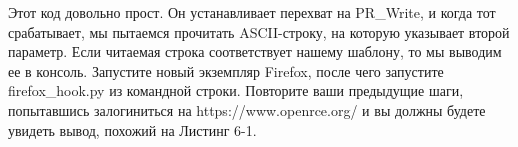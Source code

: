 \documentclass[12pt, a4paper, oneside]{book}
\begin{document}












Этот код довольно прост. Он устанавливает перехват на PR\_Write, и когда тот срабатывает, мы пытаемся прочитать ASCII-строку, на которую указывает второй параметр. Если читаемая строка соответствует нашему шаблону, то мы выводим ее в консоль. Запустите новый экземпляр Firefox, после чего запустите firefox\_hook.py из командной строки. Повторите ваши предыдущие шаги, попытавшись залогиниться на https://www.openrce.org/ и вы должны будете увидеть вывод, похожий на Листинг 6-1.
\end{document}
